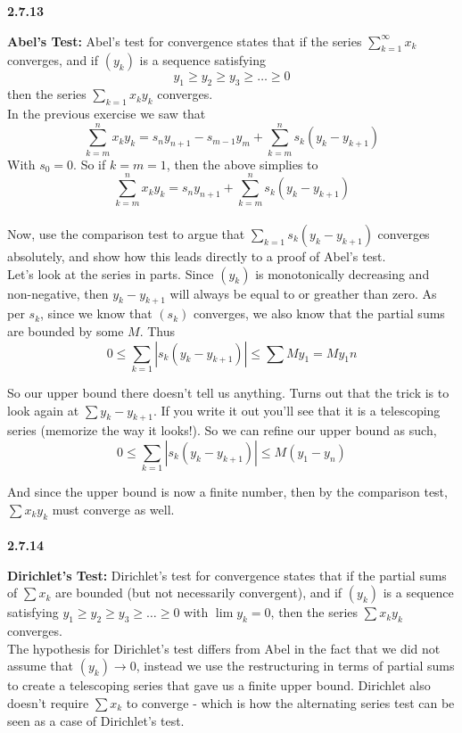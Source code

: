 \textbf{2.7.13}

\textbf{Abel's Test:}
Abel's test for convergence states that if the series $\sum^{\infty}_{k=1} x_k$ converges,
and if $(y_k)$ is a sequence satisfying
$$
y_1 \geq y_2 \geq y_3 \geq \ldots \geq 0
$$
then the series $\sum_{k=1} x_k y_k$ converges.
\\

In the previous exercise we saw that
$$
\sum^{n}_{k=m} x_k y_k = s_n y_{n+1} - s_{m-1}y_m + \sum^{n}_{k=m} s_k (y_k - y_{k+1})
$$
With $s_0 = 0$.
So if $k=m=1$, then the above simplies to
$$
\sum^{n}_{k=m} x_k y_k = s_n y_{n+1} + \sum^{n}_{k=m} s_k (y_k - y_{k+1})
$$
\\

Now, use the comparison test to argue that $\sum_{k=1} s_k (y_k - y_{k+1})$ converges absolutely,
and show how this leads directly to a proof of Abel's test.
\\


Let's look at the series in parts.
Since $(y_k)$ is monotonically decreasing and non-negative, then $y_k - y_{k+1}$ will always be
equal to or greather than zero.
As per $s_k$, since we know that $(s_k)$ converges, we also know that the partial sums are bounded
by some $M$.
Thus
$$
0 \leq \sum_{k=1} \left| s_k (y_k - y_{k+1}) \right| \leq \sum M y_1 = M y_1 n
$$

So our upper bound there doesn't tell us anything.
Turns out that the trick is to look again at $\sum y_k - y_{k+1}$.
If you write it out you'll see that it is a telescoping series (memorize the way it looks!).
So we can refine our upper bound as such,
$$
0 \leq \sum_{k=1} \left| s_k (y_k - y_{k+1}) \right| \leq  M (y_1 - y_n)
$$

And since the upper bound is now a finite number, then by the comparison test, $\sum x_k y_k$
must converge as well.
\\~\\



\textbf{2.7.14}

\textbf{Dirichlet's Test:} Dirichlet's test for convergence states that if the partial sums
of $\sum x_k$ are bounded (but not necessarily convergent),
and if $(y_k)$ is a sequence satisfying $y_1 \geq y_2 \geq y_3 \geq \ldots \geq 0$
with $\lim y_k = 0$,
then the series $\sum x_k y_k$ converges.
\\

The hypothesis for Dirichlet's test differs from Abel in the fact that we did not assume that
$(y_k) \rightarrow 0$, instead we use the restructuring in terms of partial sums to create a
telescoping series that gave us a finite upper bound.
Dirichlet also doesn't require $\sum x_k$ to converge - which is how the alternating series
test can be seen as a case of Dirichlet's test.



